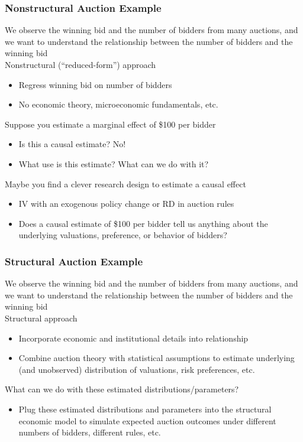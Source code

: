 \documentclass{beamer}
\begin{document}
\begin{frame}\frametitle{Nonstructural Auction Example}
    We observe the winning bid and the number of bidders from many auctions, and we want to understand the relationship between the number of bidders and the winning bid \\
    \vspace{2ex}
    Nonstructural (``reduced-form'') approach
    \begin{itemize}
        \item Regress winning bid on number of bidders
        \item No economic theory, microeconomic fundamentals, etc.
    \end{itemize}
    \vspace{2ex}
    Suppose you estimate a marginal effect of \$100 per bidder
    \begin{itemize}
    	\item Is this a causal estimate? No!
    	\item What use is this estimate? What can we do with it?
    \end{itemize}
    \vspace{2ex}
    Maybe you find a clever research design to estimate a causal effect
    \begin{itemize}
    	\item IV with an exogenous policy change or RD in auction rules
    	\item Does a causal estimate of \$100 per bidder tell us anything about the underlying valuations, preference, or behavior of bidders?
    \end{itemize}
\end{frame}

\begin{frame}\frametitle{Structural Auction Example}
    We observe the winning bid and the number of bidders from many auctions, and we want to understand the relationship between the number of bidders and the winning bid \\
    \vspace{2ex}
    Structural approach
    \begin{itemize}
        \item Incorporate economic and institutional details into relationship
        \item Combine auction theory with statistical assumptions to estimate underlying (and unobserved) distribution of valuations, risk preferences, etc.
    \end{itemize}
    \vspace{2ex}
    What can we do with these estimated distributions/parameters?
    \begin{itemize}
    	\item Plug these estimated distributions and parameters into the structural economic model to simulate expected auction outcomes under different numbers of bidders, different rules, etc.
    \end{itemize}
\end{frame}
\end{document}

